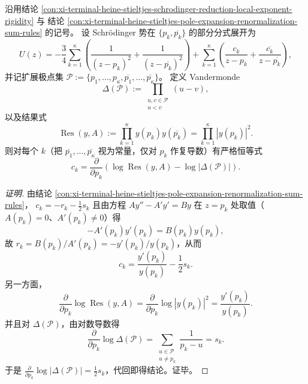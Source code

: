 \begin{conclusion}\label{con:xi-terminal-potential-tau-gradient-resultant-vandermonde}
沿用结论 \ref{con:xi-terminal-heine-stieltjes-schrodinger-reduction-local-exponent-rigidity} 与
结论 \ref{con:xi-terminal-heine-stieltjes-pole-expansion-renormalization-sum-rules} 的记号。
设 Schr\"odinger 势在 \(\{p_k,\overline{p_k}\}\) 的部分分式展开为
\[
U(z)=-\frac{3}{4}\sum_{k=1}^{\kappa}\left(\frac{1}{(z-p_k)^2}+\frac{1}{(z-\overline{p_k})^2}\right)
+\sum_{k=1}^{\kappa}\left(\frac{c_k}{z-p_k}+\frac{\overline{c_k}}{z-\overline{p_k}}\right),
\]
并记扩展极点集
\(
\mathcal P:=\{p_1,\dots,p_\kappa,\overline{p_1},\dots,\overline{p_\kappa}\}
\)。
定义 Vandermonde
\[
\Delta(\mathcal P):=\prod_{\substack{u,v\in\mathcal P\\ u<v}}(u-v),
\]
以及结果式
\[
\operatorname{Res}(y,A):=\prod_{k=1}^{\kappa}y(p_k)y(\overline{p_k})
=\prod_{k=1}^{\kappa}|y(p_k)|^2.
\]
则对每个 \(k\)（把 \(\overline{p_1},\dots,\overline{p_\kappa}\) 视为常量，仅对 \(p_k\) 作复导数）有严格恒等式
\[
\boxed{\;
c_k=\frac{\partial}{\partial p_k}\left(\log \operatorname{Res}(y,A)-\log|\Delta(\mathcal P)|\right). \;}
\]
\end{conclusion}
\begin{proof}[证明]
由结论 \ref{con:xi-terminal-heine-stieltjes-pole-expansion-renormalization-sum-rules}，
\(
c_k=-r_k-\tfrac12 s_k
\)
且由方程 \(Ay''-A'y'=By\) 在 \(z=p_k\) 处取值（\(A(p_k)=0\)、\(A'(p_k)\neq 0\)）得
\[
-A'(p_k)y'(p_k)=B(p_k)y(p_k),
\]
故 \(r_k=B(p_k)/A'(p_k)=-y'(p_k)/y(p_k)\)，从而
\[
c_k=\frac{y'(p_k)}{y(p_k)}-\frac12 s_k.
\]
另一方面，
\[
\frac{\partial}{\partial p_k}\log\operatorname{Res}(y,A)
=\frac{\partial}{\partial p_k}\log|y(p_k)|^2
=\frac{y'(p_k)}{y(p_k)}.
\]
并且对 \(\Delta(\mathcal P)\)，由对数导数得
\[
\frac{\partial}{\partial p_k}\log \Delta(\mathcal P)
=\sum_{\substack{u\in\mathcal P\\ u\neq p_k}}\frac{1}{p_k-u}
=s_k.
\]
于是
\(
\frac{\partial}{\partial p_k}\log|\Delta(\mathcal P)|
=\tfrac12 s_k
\)，代回即得结论。证毕。
\end{proof}


